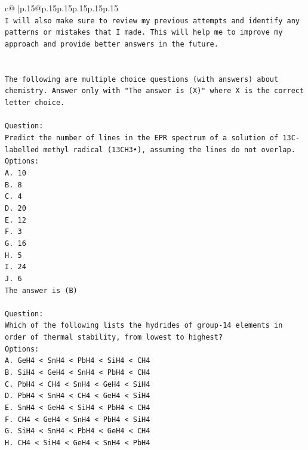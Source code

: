 \documentclass{article}
\begin{document}
{\begin{supertabular}{c@{$\;$}|p{.15\linewidth}@{}p{.15\linewidth}p{.15\linewidth}p{.15\linewidth}p{.15\linewidth}p{.15\linewidth}}
{{{\\ 
\texttt{I will also make sure to review my previous attempts and identify any patterns or mistakes that I made. This will help me to improve my approach and provide better answers in the future.} \\
\\ 
\\ 
\texttt{The following are multiple choice questions (with answers) about chemistry. Answer only with "The answer is (X)" where X is the correct letter choice.} \\
\\ 
\texttt{Question:} \\
\texttt{Predict the number of lines in the EPR spectrum of a solution of 13C{-}labelled methyl radical (13CH3•), assuming the lines do not overlap.} \\
\texttt{Options:} \\
\texttt{A. 10} \\
\texttt{B. 8} \\
\texttt{C. 4} \\
\texttt{D. 20} \\
\texttt{E. 12} \\
\texttt{F. 3} \\
\texttt{G. 16} \\
\texttt{H. 5} \\
\texttt{I. 24} \\
\texttt{J. 6} \\
\texttt{The answer is (B)} \\
\\ 
\texttt{Question:} \\
\texttt{Which of the following lists the hydrides of group{-}14 elements in order of thermal stability, from lowest to highest?} \\
\texttt{Options:} \\
\texttt{A. GeH4 < SnH4 < PbH4 < SiH4 < CH4} \\
\texttt{B. SiH4 < GeH4 < SnH4 < PbH4 < CH4} \\
\texttt{C. PbH4 < CH4 < SnH4 < GeH4 < SiH4} \\
\texttt{D. PbH4 < SnH4 < CH4 < GeH4 < SiH4} \\
\texttt{E. SnH4 < GeH4 < SiH4 < PbH4 < CH4} \\
\texttt{F. CH4 < GeH4 < SnH4 < PbH4 < SiH4} \\
\texttt{G. SiH4 < SnH4 < PbH4 < GeH4 < CH4} \\
\texttt{H. CH4 < SiH4 < GeH4 < SnH4 < PbH4} \\
}}}
\end{supertabular}}
\end{document}
